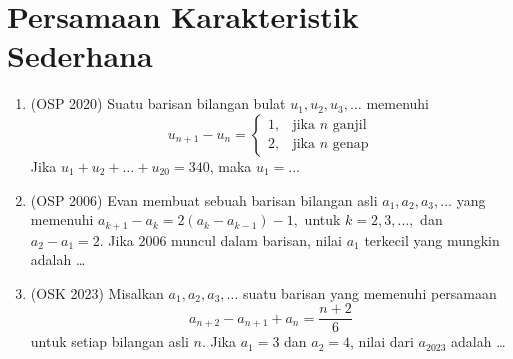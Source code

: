\documentclass[12pt]{scrartcl}
\begin{document}
\section{Persamaan Karakteristik Sederhana}

\begin{enumerate}[resume]

	\item (OSP 2020)
	Suatu barisan bilangan bulat $u_1, u_2, u_3, \dots$ memenuhi
	\[
	u_{n+1}-u_n =
	\begin{cases}
	1, & \text{jika } n \text{ ganjil} \\
	2, & \text{jika } n \text{ genap}
	\end{cases}
	\]
	Jika $u_1+u_2+\dots+u_{20}=340$, maka $u_1=\dots$

	\item (OSP 2006)
	Evan membuat sebuah barisan bilangan asli $a_{1}, a_{2}, a_{3},\dots$ yang memenuhi $a_{k+1}-a_{k}=2(a_{k}-a_{k-1})-1,$ untuk $k=2,3,\dots,$ dan $a_{2}-a_{1}=2$. Jika 2006 muncul dalam barisan, nilai $a_{1}$ terkecil yang mungkin adalah \dots

	\item (OSK 2023)
	Misalkan $a_{1},a_{2},a_{3},\dots$ suatu barisan yang memenuhi persamaan
	\[ a_{n+2}-a_{n+1}+a_{n}=\frac{n+2}{6} \]
	untuk setiap bilangan asli $n$. Jika $a_{1}=3$ dan $a_{2}=4$, nilai dari $a_{2023}$ adalah \dots

\end{enumerate}

\end{document}
